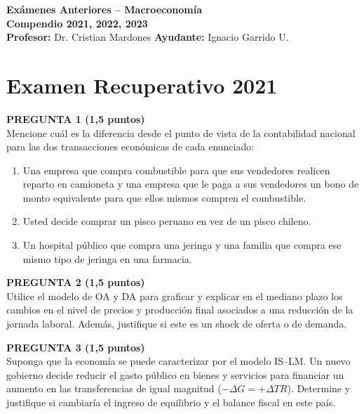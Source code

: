 \documentclass[11pt,addpoints]{article}
\begin{document}
\vspace*{0.1cm}

\begin{center}
{\Large \bfseries Exámenes Anteriores – Macroeconomía \\[0.25cm]}
\textbf{Compendio 2021, 2022, 2023}\\[0.3cm]
\textbf{Profesor:} Dr. Cristian Mardones \textbf{Ayudante:} Ignacio Garrido U.
\end{center}


\section*{Examen Recuperativo 2021}

\textbf{PREGUNTA 1 (1,5 puntos)}\\[0.2cm]
Mencione cuál es la diferencia desde el punto de vista de la contabilidad nacional para las dos transacciones económicas de cada enunciado:

\begin{enumerate}[label=\alph*)]
\item Una empresa que compra combustible para que sus vendedores realicen reparto en camioneta y una empresa que le paga a sus vendedores un bono de monto equivalente para que ellos mismos compren el combustible.
\item Usted decide comprar un pisco peruano en vez de un pisco chileno.
\item Un hospital público que compra una jeringa y una familia que compra ese mismo tipo de jeringa en una farmacia.
\end{enumerate}

\vspace{0.4cm}

\textbf{PREGUNTA 2 (1,5 puntos)}\\[0.2cm]
Utilice el modelo de OA y DA para graficar y explicar en el mediano plazo los cambios en el nivel de precios y producción final asociados a una reducción de la jornada laboral. Además, justifique si este es un shock de oferta o de demanda.

\vspace{0.4cm}

\textbf{PREGUNTA 3 (1,5 puntos)}\\[0.2cm]
Suponga que la economía se puede caracterizar por el modelo IS–LM.  
Un nuevo gobierno decide reducir el gasto público en bienes y servicios para financiar un aumento en las transferencias de igual magnitud ($-\Delta G = +\Delta TR$). Determine y justifique si cambiaría el ingreso de equilibrio y el balance fiscal en este país.
\end{document}
